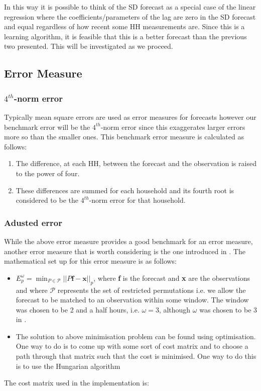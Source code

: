 \documentclass[a4paper]{article}
\begin{document}
In this way it is possible to think of the SD forecast as a special case of the linear regression where the coefficients/parameters of the lag are zero in the SD forecast and equal regardless of how recent some HH measurements are. Since this is a learning algorithm, it is feasible that this is a better forecast than the previous two presented. This will be investigated as we proceed.


\subsection{Error Measure}
\label{subsec:ErrMethods}

\subsubsection{$4^{th}$-norm error}
\label{subsubsec:4-norm} Typically mean square errors are used as error measures for forecasts however our benchmark error will be the $4^{th}$-norm error since this exaggerates larger errors more so than the smaller ones. This benchmark error measure is calculated as follows:
\begin{enumerate}
\item The difference, at each HH, between the forecast and the observation is raised to the power of four.
\item These differences are summed for each household and its fourth root is considered to be the $4^{th}$-norm error for that household.
\end{enumerate}

\subsubsection{Adusted error}
\label{subsubsec:Adj_err} While the above error measure provides a good benchmark for an error measure, another error measure that is worth considering is the one introduced in \cite{dan14}. The mathematical set up for this error measure is as follows:
\begin{itemize}
\item $E_p^\omega = \displaystyle{\min_{P \in \mathscr{P}}||P\textbf{f}-\textbf{x}||_p}$, where \textbf{f} is the forecast and \textbf{x} are the observations and where $\mathscr{P}$ represents the set of restricted permutations i.e. we allow the forecast to be matched to an observation within some window. The window was chosen to be 2 and a half hours, i.e. $\omega = 3$, although $\omega$ was chosen to be 3 in \cite{dan14}.
\item The solution to above minimisation problem can be found using optimisation. One way to do is to come up with some sort of cost matrix and to choose a path through that matrix such that the cost is minimised. One way to do this is to use the Hungarian algorithm
\end{itemize}
The cost matrix used in the implementation is: \newline
\end{document}

